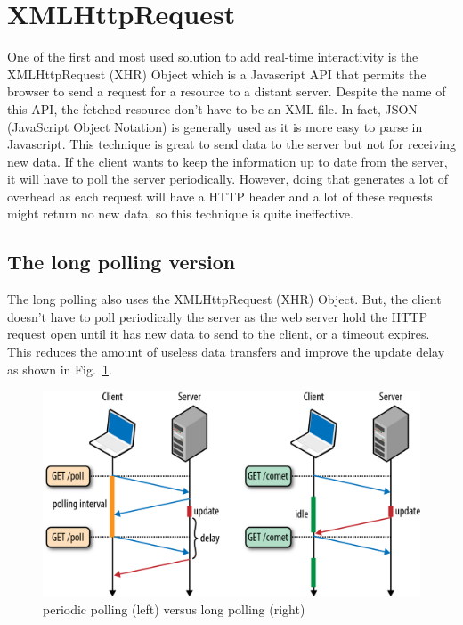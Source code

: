 \documentclass[journal,compsoc]{IEEEtran}
\begin{document}
\section{XMLHttpRequest}

One of the first and most used solution to add real-time interactivity is the XMLHttpRequest (XHR) Object which is a Javascript API that permits the browser to send a request for a resource to a distant server.
Despite the name of this API, the fetched resource don't have to be an XML file.
In fact, JSON (JavaScript Object Notation) is generally used as it is more easy to parse in Javascript.
This technique is great to send data to the server but not for receiving new data.
If the client wants to keep the information up to date from the server, it will have to poll the server periodically.
However, doing  that generates a lot of overhead as each request will have a HTTP header and a lot of these requests might return no new data, so this technique is quite ineffective.

\subsection{The long polling version}

The long polling also uses the XMLHttpRequest (XHR) Object.
But, the client doesn't have to poll periodically the server as the web server hold the HTTP request open until it has new data to send to the client, or a timeout expires.
This reduces the amount of useless data transfers and improve the update delay as shown in Fig.~\ref{poll_vs_lpoll}.

\begin{figure}
  \centering
  \label{poll_vs_lpoll}
  \includegraphics[width=\linewidth]{poll_vs_lpoll}
  \caption{periodic polling (left) versus long polling (right)}
\end{figure}
\end{document}
